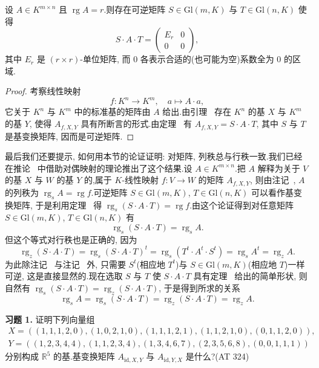 \begin{theorem}\label{thm:3.4.8}
设 $A \in K^{m \times n}$ 且 $\operatorname{rg} A = r$.则存在可逆矩阵 $S \in \mathrm{Gl}(m, K)$ 与 $T \in \mathrm{Gl}(n, K)$ 使得
\[
S \cdot A \cdot T = \begin{pmatrix} E_r & 0 \\ 0 & 0 \end{pmatrix},
\]
其中 $E_r$ 是 $(r \times r)$-单位矩阵, 而 $0$ 各表示合适的(也可能为空)系数全为 $0$ 的区域.
\end{theorem}

\begin{proof}
考察线性映射
\[
f \colon K^n \longrightarrow K^m, \quad a \longmapsto A \cdot a,
\]
它关于 $K^n$ 与 $K^m$ 中的标准基的矩阵由 $A$ 给出.由引理~ 存在 $K^n$ 的基 $X$ 与 $K^m$ 的基 $Y$, 使得 $A_{f, X, Y}$ 具有所断言的形式.由定理~ 有 $A_{f, X, Y} = S \cdot A \cdot T$, 其中 $S$ 与 $T$ 是基变换矩阵, 因而是可逆矩阵.
\end{proof}

最后我们还要提示, 如何用本节的论证证明: 对矩阵, 列秩总与行秩一致.我们已经在推论~ 中借助对偶映射的理论推出了这个结果.设 $A \in K^{m \times n}$.把 $A$ 解释为关于 $V$ 的基 $X$ 与 $W$ 的基 $Y$ 的,属于 $K$-线性映射 $f \colon V \longrightarrow W$ 的矩阵 $A_{f, X, Y}$, 则由注记~, $A$ 的列秩为 $\operatorname{rg}_s A = \operatorname{rg} f$.可逆矩阵 $S \in \mathrm{Gl}(m, K)$, $T \in \mathrm{Gl}(n, K)$ 可以看作基变换矩阵, 于是利用定理~ 得 $\operatorname{rg}_s(S \cdot A \cdot T) = \operatorname{rg} f$.由这个论证得到对任意矩阵 $S \in \mathrm{Gl}(m, K)$, $T \in \mathrm{Gl}(n, K)$ 有
\[
\operatorname{rg}_s(S \cdot A \cdot T) = \operatorname{rg}_s A\text{.}
\]
但这个等式对行秩也是正确的, 因为
\[
\operatorname{rg}_z(S \cdot A \cdot T) = \operatorname{rg}_s(S \cdot A \cdot T)^t = \operatorname{rg}_s(T^t \cdot A^t \cdot S^t) = \operatorname{rg}_s A^t = \operatorname{rg}_z A\text{.}
\]
为此除注记~ 与注记~ 外, 只需要 $S^t$(相应地 $T^t$)与 $S \in \mathrm{Gl}(m, K)$(相应地 $T$)一样可逆, 这是直接显然的.现在选取 $S$ 与 $T$ 使 $S \cdot A \cdot T$ 具有定理~ 给出的简单形状, 则自然有 $\operatorname{rg}_s(S \cdot A \cdot T) = \operatorname{rg}_z(S \cdot A \cdot T)$, 于是得到所求的关系
\[
\operatorname{rg}_s A = \operatorname{rg}_s(S \cdot A \cdot T) = \operatorname{rg}_z(S \cdot A \cdot T) = \operatorname{rg}_z A\text{.}
\]

\aufgaben

\noindent\textbf{习题 1.} 证明下列向量组
\[
\begin{array}{l}
X = \left((1, 1, 1, 2, 0), (1, 0, 2, 1, 0), (1, 1, 1, 2, 1), (1, 1, 2, 1, 0), (0, 1, 1, 2, 0)\right), \\
Y = \left((1, 2, 3, 4, 4), (1, 1, 2, 3, 4), (1, 3, 4, 6, 7), (2, 3, 5, 6, 8), (0, 0, 1, 1, 1)\right)
\end{array}
\]
分别构成 $\mathbb{R}^5$ 的基.基变换矩阵 $A_{\mathrm{id}, X, Y}$ 与 $A_{\mathrm{id}, Y, X}$ 是什么?(AT 324)

